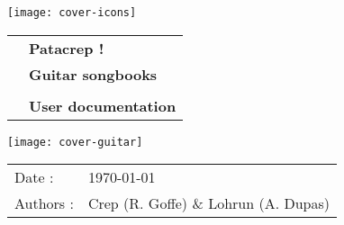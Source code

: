 \begin{titlepage}

  \texttt{[image: cover-icons]}
  \vspace{2cm}

  \begin{tabular}{l l}
    \hspace{2cm} & \textbf{\Huge Patacrep !}\\
    & \textbf{\Large Guitar songbooks}\\
    & \\
    & \textbf{\large User documentation}\\
  \end{tabular}

  \hspace{-2cm}\texttt{[image: cover-guitar]}

  \begin{flushright}
    \begin{tabular}{l l}
      Date : & \today \\
      Authors : &  Crep (R. Goffe) \& Lohrun (A. Dupas) \\
    \end{tabular}
  \end{flushright}

\end{titlepage}
